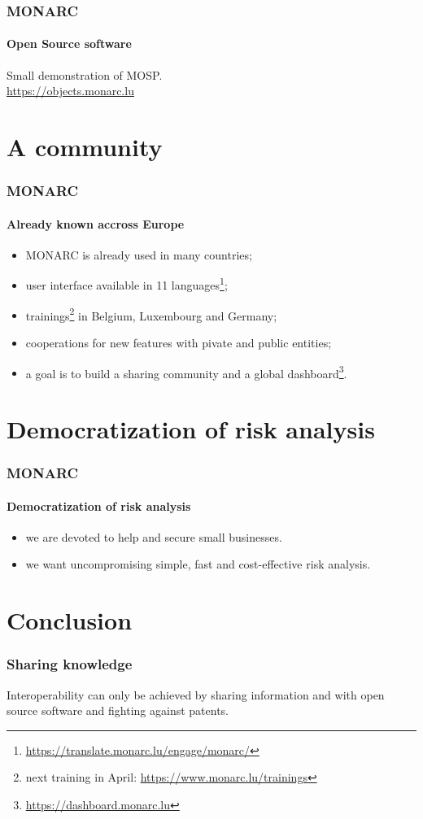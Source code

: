 \documentclass[]{beamer}
\begin{document}
\begin{frame}
  \frametitle{MONARC}
  \framesubtitle{Open Source software}
  Small demonstration of MOSP.\\
  \url{https://objects.monarc.lu}
\end{frame}


\section{A community}
\begin{frame}
  \frametitle{MONARC}
  \framesubtitle{Already known accross Europe}
  \begin{center}
    \begin{itemize}
      \item MONARC is already used in many countries;
      \item user interface available in 11 languages\footnote{\url{https://translate.monarc.lu/engage/monarc/}};
      \item trainings\footnote{next training in April: \url{https://www.monarc.lu/trainings}} in Belgium, Luxembourg and Germany;
      \item cooperations for new features with pivate and public entities;
      \item a goal is to build a sharing community and a global dashboard\footnote{\url{https://dashboard.monarc.lu}}.
    \end{itemize}
  \end{center}
\end{frame}


\section{Democratization of risk analysis}
\begin{frame}
  \frametitle{MONARC}
  \framesubtitle{Democratization of risk analysis}
  \begin{center}
    \begin{itemize}
      \item we are devoted to help and secure small businesses.
      \item we want uncompromising simple, fast and cost-effective risk analysis.
    \end{itemize}
  \end{center}
\end{frame}



\section*{Conclusion}
\begin{frame}
  \frametitle{Sharing knowledge}
  \begin{center}
    Interoperability can only be achieved by sharing information and with open source software and fighting against patents.
  \end{center}
\end{frame}
\end{document}
